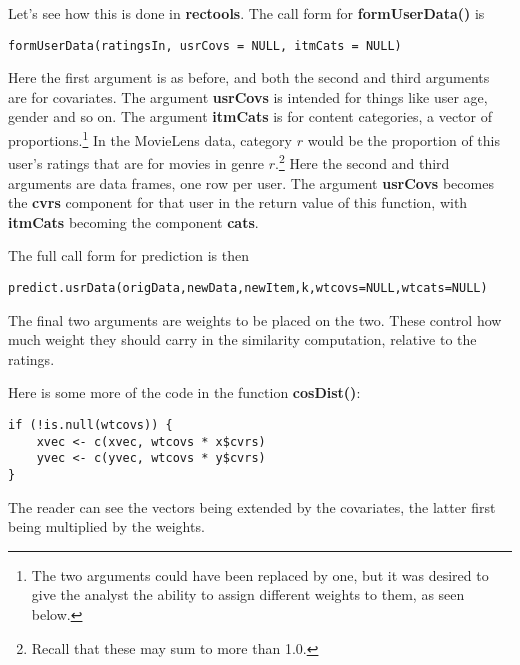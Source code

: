 Let's see how this is done in \textbf{rectools}.  The call form for
\textbf{formUserData()} is

\begin{lstlisting}
formUserData(ratingsIn, usrCovs = NULL, itmCats = NULL)
\end{lstlisting}

Here the first argument is as before, and both the second and third
arguments are for covariates.  The argument \textbf{usrCovs} is intended
for things like user age, gender and so on.  The argument
\textbf{itmCats} is for content categories, a vector of
proportions.\footnote{The two arguments could have been replaced by one,
but it was desired to give the analyst the ability to assign different
weights to them, as seen below.}  In the MovieLens data, category $r$
would be the proportion of this user's ratings that are for movies in
genre $r.$\footnote{Recall that these may sum to more than 1.0.} Here
the second and third arguments are data frames, one row per
user.  The argument \textbf{usrCovs} becomes the \textbf{cvrs} component
for that user in the return value of this function, with
\textbf{itmCats} becoming the component \textbf{cats}.

The full call form for prediction is then

\begin{lstlisting}
predict.usrData(origData,newData,newItem,k,wtcovs=NULL,wtcats=NULL)
\end{lstlisting}

The final two arguments are weights to be placed on the two.  These
control how much weight they should carry in the similarity computation,
relative to the ratings.

Here is some more of the code in the function \textbf{cosDist()}:

\begin{lstlisting}
if (!is.null(wtcovs)) {
    xvec <- c(xvec, wtcovs * x$cvrs)
    yvec <- c(yvec, wtcovs * y$cvrs)
}
\end{lstlisting}

The reader can see the vectors being extended by the covariates, the
latter first being multiplied by the weights.


\iffalse

idxs <- sample(1:nrow(ml),1000)
ml <- ml[,1:3]
mltrn <- ml[-idxs,]
mltst <- ml[idxs,]
library(rectools)
ud <- formUserData(mltrn)

k <- 5
z <- apply(mltst[,-3],1,pn); mean(abs(z-mltst[,3]),na.rm=T)

predname <- function(userData,oneInputRow,k)
{
   usr <- oneInputRow[1]
   itm <- oneInputRow[2]
   udElement <- userData[[as.character(usr)]]
   predict(userData,udElement,itm,k)
}

pn <- function(oneInputRow) predname(ud,oneInputRow,k)


\fi


